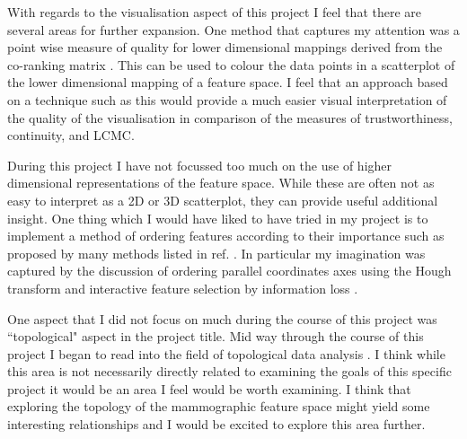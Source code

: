 With regards to the visualisation aspect of this project I feel that there are several areas for further expansion. One method that captures my attention was a point wise measure of quality for lower dimensional mappings derived from the co-ranking matrix \cite{mokbel2013visualizing}. This can be used to colour the data points in a scatterplot of the lower dimensional mapping of a feature space. I feel that an approach based on a technique such as this would provide a much easier visual interpretation of the quality of the visualisation in comparison of the measures of trustworthiness, continuity, and LCMC.

During this project I have not focussed too much on the use of higher dimensional representations of the feature space. While these are often not as easy to interpret as a 2D or 3D scatterplot, they can provide useful additional insight. One thing which I would have liked to have tried in my project is to implement a method of ordering features according to their importance such as proposed by many methods listed in ref. \cite{bertini2011quality}. In particular my imagination was captured by the discussion of ordering parallel coordinates axes using the Hough transform \cite{tatu2009combining} and interactive feature selection by information loss \cite{johansson2009interactive}.

One aspect that I did not focus on much during the course of this project was ``topological" aspect in the project title. Mid way through the course of this project I began to read into the field of topological data analysis \cite{carlsson2009topology}. I think while this area is not necessarily directly related to examining the goals of this specific project it would be an area I feel would be worth examining. I think that exploring the topology of the mammographic feature space might yield some interesting relationships and I would be excited to explore this area further.

 